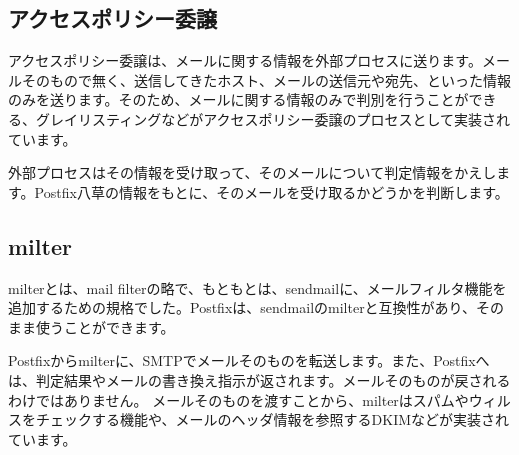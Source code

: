 \subsection{アクセスポリシー委譲}
アクセスポリシー委譲は、メールに関する情報を外部プロセスに送ります。メールそのもので無く、送信してきたホスト、メールの送信元や宛先、といった情報のみを送ります。そのため、メールに関する情報のみで判別を行うことができる、グレイリスティングなどがアクセスポリシー委譲のプロセスとして実装されています。

外部プロセスはその情報を受け取って、そのメールについて判定情報をかえします。Postfix八草の情報をもとに、そのメールを受け取るかどうかを判断します。

\subsection{milter}
milterとは、mail filterの略で、もともとは、sendmailに、メールフィルタ機能を追加するための規格でした。Postfixは、sendmailのmilterと互換性があり、そのまま使うことができます。

Postfixからmilterに、SMTPでメールそのものを転送します。また、Postfixへは、判定結果やメールの書き換え指示が返されます。メールそのものが戻されるわけではありません。
メールそのものを渡すことから、milterはスパムやウィルスをチェックする機能や、メールのヘッダ情報を参照するDKIMなどが実装されています。